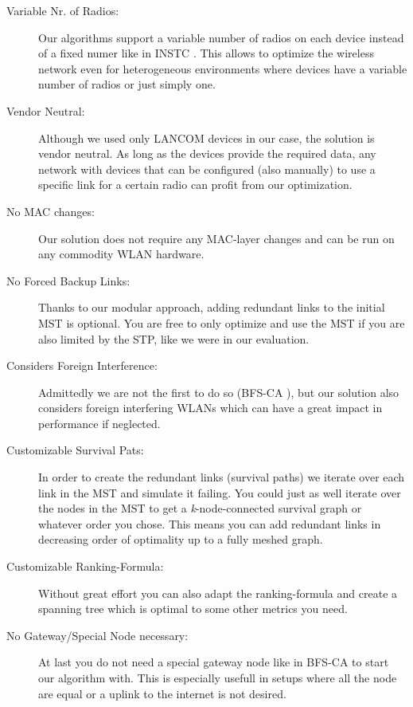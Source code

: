       \begin{description}
	\item [Variable Nr. of Radios:] Our algorithms support a variable number of radios on each device instead of a fixed numer like in \ac{INSTC} \cite{INSTC}. 
	  This allows to optimize the wireless network even for heterogeneous environments where devices have a variable number of radios or just simply one.
	\item [Vendor Neutral:] Although we used only LANCOM devices in our case, the solution is vendor neutral. As long as the devices provide the required data,
	  any network with devices that can be configured (also manually) to use a specific link for a certain radio can profit from our optimization.
	\item [No MAC changes:] Our solution does not require any \ac{MAC}-layer changes and can be run on any commodity \ac{WLAN} hardware.
	\item [No Forced Backup Links:] Thanks to our modular approach, adding redundant links to the initial \ac{MST} is optional. 
	  You are free to only optimize and use the \ac{MST} if you are also limited by the \ac{STP}, like we were in our evaluation.
	\item [Considers Foreign Interference:] Admittedly we are not the first to do so (\ac{BFS-CA} \cite{BFS-CA}),
	  but our solution also considers foreign interfering WLANs which can have a great impact in performance if neglected.
	\item [Customizable Survival Pats:] In order to create the redundant links (survival paths) we iterate over each link in the \ac{MST} and simulate it failing.
	  You could just as well iterate over the nodes in the \ac{MST} to get a \textit{k}-node-connected survival graph or whatever order you chose.
	  This means you can add redundant links in decreasing order of optimality up to a fully meshed graph.
	\item [Customizable Ranking-Formula:] Without great effort you can also adapt the ranking-formula and create a spanning tree which is optimal to some other metrics you need.
	\item [No Gateway/Special Node necessary:] At last you do not need a special gateway node like in \ac{BFS-CA} \cite{BFS-CA} to start our algorithm with.
	  This is especially usefull in setups where all the node are equal or a uplink to the internet is not desired.
      \end{description}